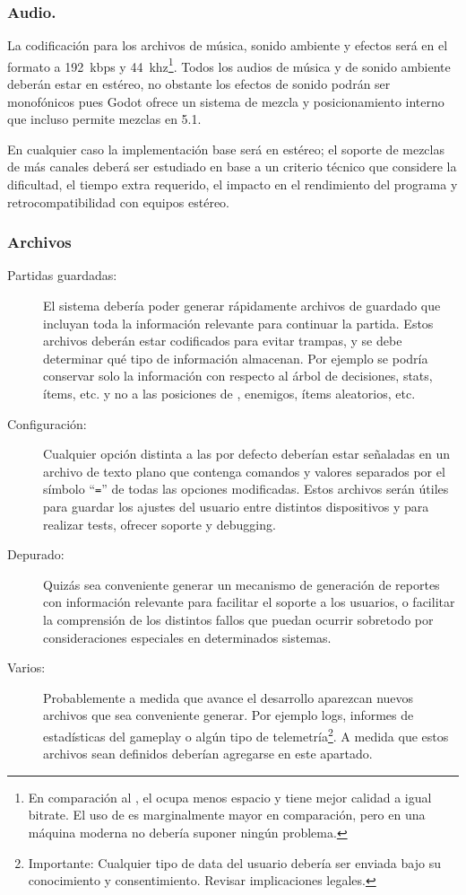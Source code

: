 \subsubsection{Audio.}
La codificación para los archivos de música, sonido ambiente y efectos será en el formato  a 192~kbps y 44~khz\footnote{En comparación al , el  ocupa menos espacio y tiene mejor calidad a igual bitrate. El uso de  es marginalmente mayor en comparación, pero en una máquina moderna no debería suponer ningún problema.}. Todos los audios de música y de sonido ambiente deberán estar en estéreo, no obstante los efectos de sonido podrán ser monofónicos pues Godot ofrece un sistema de mezcla y posicionamiento interno que incluso permite mezclas en 5.1.

En cualquier caso la implementación base será en estéreo; el soporte de mezclas de más canales deberá ser estudiado en base a un criterio técnico que considere la dificultad, el tiempo extra requerido, el impacto en el rendimiento del programa y retrocompatibilidad con equipos estéreo.

\subsubsection{Archivos}
\begin{description}
\item[Partidas guardadas:] El sistema debería poder generar rápidamente archivos de guardado que incluyan toda la información relevante para continuar la partida. Estos archivos deberán estar codificados para evitar trampas, y se debe determinar qué tipo de información almacenan. Por ejemplo se podría conservar solo la información con respecto al árbol de decisiones, stats, ítems, etc. y no a las posiciones de , enemigos, ítems aleatorios, etc.

\item[Configuración:] Cualquier opción distinta a las por defecto deberían estar señaladas en un archivo de texto plano que contenga comandos y valores separados por el símbolo “\texttt{=}” de todas las opciones modificadas.
Estos archivos serán útiles para guardar los ajustes del usuario entre distintos dispositivos y para realizar tests, ofrecer soporte y debugging.

\item[Depurado:] Quizás sea conveniente generar un mecanismo de generación de reportes con información relevante para facilitar el soporte a los usuarios, o facilitar la comprensión de los distintos fallos que puedan ocurrir sobretodo por consideraciones especiales en determinados sistemas.

\item[Varios:] Probablemente a medida que avance el desarrollo aparezcan nuevos archivos que sea conveniente generar. Por ejemplo logs, informes de estadísticas del gameplay o algún tipo de telemetría\footnote{Importante: Cualquier tipo de data del usuario debería ser enviada bajo su conocimiento y consentimiento. Revisar implicaciones legales.}. A medida que estos archivos sean definidos deberían agregarse en este apartado.
\end{description}

